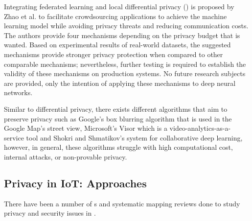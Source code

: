 Integrating federated learning and local differential privacy (\hyperlink{\acronym}{\acronym}) is proposed
by Zhao et al. \cite{zhao2020local} to facilitate crowdsourcing applications to
achieve the machine learning model while avoiding privacy threats and reducing
communication costs. The authors provide four mechanisms depending on the
privacy budget that is wanted. Based on experimental results of real-world
datasets, the suggested mechanisms provide stronger privacy protection when
compared to other comparable mechanisms; nevertheless, further testing is
required to establish the validity of these mechanisms on production systems.
No future research subjects are provided, only the intention of applying
these mechanisms to deep neural networks.

Similar to differential privacy, there exists different algorithms that aim to
preserve privacy such as Google's box blurring algorithm \cite{FromeLarge}
that is used in the Google Map's street view, Microsoft's Visor \cite{poddar2020visor}
which is a video-analytics-as-a-service tool and Shokri and Shmatikov's
\cite{ShokriPrivacy} system for collaborative deep learning, however, in
general, these algorithms struggle with high computational cost, internal
attacks, or non-provable privacy.

\subsection{Privacy in IoT: Approaches}

There have been a number of \hyperlink{\acronym}{\acronym}s \cite{Gupta2022Privacy, Kuhtreiber2022survey, sicari2015security, LinSurvey, yang2022overview, zubaydi2023leveraging}
and systematic mapping reviews \cite{porras2018security, ahmed2019aspects}
done to study privacy and security issues in \hyperlink{\acronym}{\acronym}.

